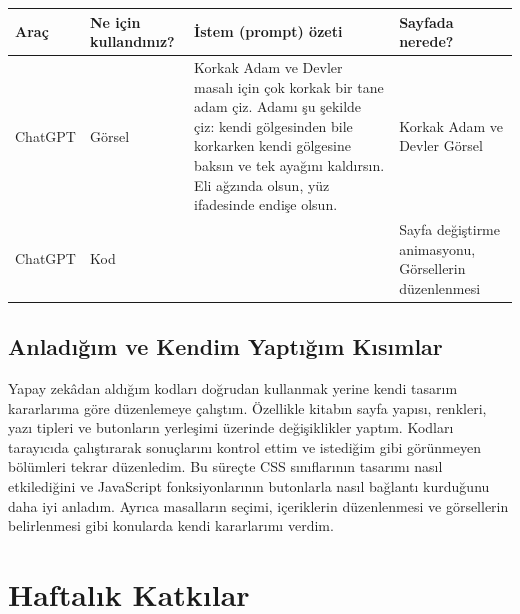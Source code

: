 \documentclass[12pt,a4paper]{article}
\begin{document}
\begin{longtable}{@{}p{2.6cm}p{3.6cm}p{4.2cm}p{3.4cm}@{}}
\toprule
\textbf{Araç} & \textbf{Ne için kullandınız?} & \textbf{İstem (prompt) özeti} & \textbf{Sayfada nerede?} \\
\midrule
\endhead
\relax ChatGPT & Görsel & Korkak Adam ve Devler masalı için çok korkak bir tane adam çiz. Adamı şu şekilde çiz: kendi gölgesinden bile korkarken kendi gölgesine baksın ve tek ayağını kaldırsın. Eli ağzında olsun, yüz ifadesinde endişe olsun. & Korkak Adam ve Devler Görsel
\\
\relax ChatGPT & Kod  &  &  Sayfa değiştirme animasyonu, Görsellerin düzenlenmesi\\
\bottomrule
\end{longtable}

\subsection{Anladığım ve Kendim Yaptığım Kısımlar}
Yapay zekâdan aldığım kodları doğrudan kullanmak yerine kendi tasarım kararlarıma göre düzenlemeye çalıştım. Özellikle kitabın sayfa yapısı, renkleri, yazı tipleri ve butonların yerleşimi üzerinde değişiklikler yaptım. Kodları tarayıcıda çalıştırarak sonuçlarını kontrol ettim ve istediğim gibi görünmeyen bölümleri tekrar düzenledim. Bu süreçte CSS sınıflarının tasarımı nasıl etkilediğini ve JavaScript fonksiyonlarının butonlarla nasıl bağlantı kurduğunu daha iyi anladım. Ayrıca masalların seçimi, içeriklerin düzenlenmesi ve görsellerin belirlenmesi gibi konularda kendi kararlarımı verdim.

\section{Haftalık Katkılar}
\end{document}

